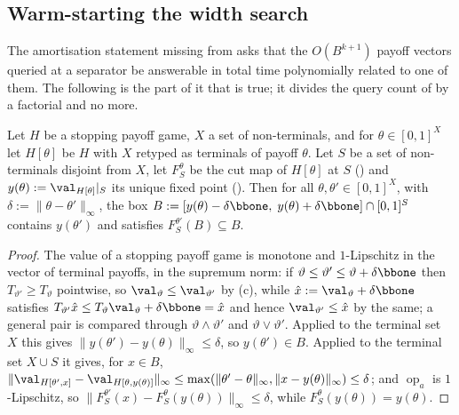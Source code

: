 \subsection{Warm-starting the width search}\label{sec:fsa-warm}

The amortisation statement missing from  asks that the
$O(B^{k+1})$ payoff vectors queried at a separator be answerable in total time
polynomially related to one of them. The following is the part of it that is
true; it divides the query count of  by a factorial and no more.

\begin{lemma}\label{fsa:warm}
Let $H$ be a stopping payoff game, $X$ a set of non-terminals, and for
$\theta\in[0,1]^{X}$ let $H[\theta]$ be $H$ with $X$ retyped as terminals of
payoff $\theta$. Let $S$ be a set of non-terminals disjoint from $X$, let
$F^{\theta}_S$ be the cut map of $H[\theta]$ at $S$ () and
$y(\theta):=\val_{H[\theta]}|_S$ its unique fixed point
(). Then for all $\theta,\theta'\in[0,1]^{X}$, with
$\delta:=\|\theta-\theta'\|_\infty$, the box
$B:=[y(\theta)-\delta\bbone,\;y(\theta)+\delta\bbone]\cap[0,1]^{S}$
contains $y(\theta')$ and satisfies $F^{\theta'}_S(B)\subseteq B$.
\end{lemma}

\begin{proof}
The value of a stopping payoff game is monotone and $1$-Lipschitz in the
vector of terminal payoffs, in the supremum norm: if
$\vartheta\le\vartheta'\le\vartheta+\delta\bbone$ then
$T_{\vartheta'}\ge T_\vartheta$ pointwise, so
$\val_{\vartheta}\le\val_{\vartheta'}$ by (c), while
$\hat x:=\val_{\vartheta}+\delta\bbone$ satisfies
$T_{\vartheta'}\hat x\le T_{\vartheta}\val_\vartheta+\delta\bbone=\hat x$ and
hence $\val_{\vartheta'}\le\hat x$ by the same; a general pair is compared
through $\vartheta\wedge\vartheta'$ and $\vartheta\vee\vartheta'$. Applied to
the terminal set $X$ this gives $\|y(\theta')-y(\theta)\|_\infty\le\delta$, so
$y(\theta')\in B$. Applied to the terminal set $X\cup S$ it gives, for
$x\in B$,
$\|\val_{H[\theta',x]}-\val_{H[\theta,y(\theta)]}\|_\infty\le
\max(\|\theta'-\theta\|_\infty,\|x-y(\theta)\|_\infty)\le\delta$; and
$\operatorname{op}_a$ is $1$-Lipschitz, so
$\|F^{\theta'}_S(x)-F^{\theta}_S(y(\theta))\|_\infty\le\delta$, while
$F^{\theta}_S(y(\theta))=y(\theta)$.
\end{proof}

